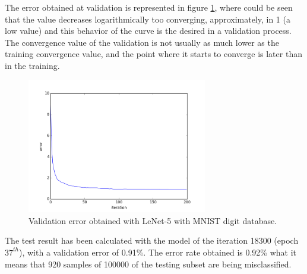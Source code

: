 The error obtained at validation is represented in figure \ref{fig:Lenetresult}, where could be seen that the value decreases logarithmically too converging, approximately, in 1 (a low value) and this behavior of the curve is the desired in a validation process. The convergence value of the validation is not usually as much lower as the training convergence value, and the point where it starts to converge is later than in the training.\\

\begin{figure}[htb]
\centering
\includegraphics[width=0.7\textwidth]{images/ModificandoLenet/error_lenet.png}
\caption{Validation error obtained with LeNet-5 with MNIST digit database.} \label{fig:Lenetresult}
\end{figure}

The test result has been calculated with the model of the iteration 18300 (epoch $37^{th}$), with a validation error of 0.91\%. The error rate obtained is 0.92\% what it means that 920 samples of 100000 of the testing subset are being misclassified.\\


